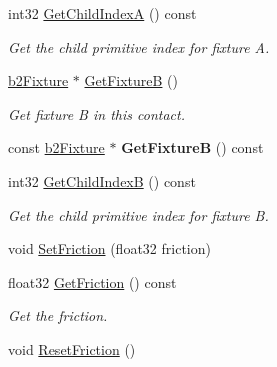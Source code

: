 \begin{DoxyCompactItemize}
\item 
\mbox{\label{classb2Contact_aa0b0739e6615ba8d38e9b5bd8761dc31}} 
int32 \hyperlink{classb2Contact_aa0b0739e6615ba8d38e9b5bd8761dc31}{Get\+Child\+IndexA} () const
\begin{DoxyCompactList}\small\item\em Get the child primitive index for fixture A. \end{DoxyCompactList}\item 
\mbox{\label{classb2Contact_a91678921e1db65425e625f4dcd8c252d}} 
\hyperlink{classb2Fixture}{b2\+Fixture} $\ast$ \hyperlink{classb2Contact_a91678921e1db65425e625f4dcd8c252d}{Get\+FixtureB} ()
\begin{DoxyCompactList}\small\item\em Get fixture B in this contact. \end{DoxyCompactList}\item 
\mbox{\label{classb2Contact_a3944983c442bd957c1c0de0d11ae3211}} 
const \hyperlink{classb2Fixture}{b2\+Fixture} $\ast$ {\bfseries Get\+FixtureB} () const
\item 
\mbox{\label{classb2Contact_aab201068e7f2cc31c69b1f5c8471d672}} 
int32 \hyperlink{classb2Contact_aab201068e7f2cc31c69b1f5c8471d672}{Get\+Child\+IndexB} () const
\begin{DoxyCompactList}\small\item\em Get the child primitive index for fixture B. \end{DoxyCompactList}\item 
void \hyperlink{classb2Contact_a5e8fbb6bb2966ac84272bb0ea9d2e4c7}{Set\+Friction} (float32 friction)
\item 
\mbox{\label{classb2Contact_a7650ec27931c82f3914f37fdeb267b02}} 
float32 \hyperlink{classb2Contact_a7650ec27931c82f3914f37fdeb267b02}{Get\+Friction} () const
\begin{DoxyCompactList}\small\item\em Get the friction. \end{DoxyCompactList}\item 
\mbox{\label{classb2Contact_ad66d9290da187cef4c9f48c5766d4460}} 
void \hyperlink{classb2Contact_ad66d9290da187cef4c9f48c5766d4460}{Reset\+Friction} ()

\end{DoxyCompactItemize}
